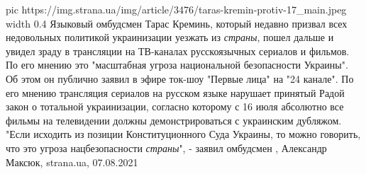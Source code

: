\ifcmt
  pic https://img.strana.ua/img/article/3476/taras-kremin-protiv-17_main.jpeg
  width 0.4
\fi
Языковый омбудсмен Тарас Креминь, который недавно призвал всех недовольных
политикой украинизации уезжать из \emph{страны}, пошел дальше и увидел зраду в
трансляции на ТВ-каналах русскоязычных сериалов и фильмов. По его мнению это
"масштабная угроза национальной безопасности Украины".  Об этом он публично
заявил в эфире ток-шоу "Первые лица" на "24 канале".  По его мнению трансляция
сериалов на русском языке нарушает принятый Радой закон о тотальной
украинизации, согласно которому с 16 июля абсолютно все фильмы на телевидении
должны демонстрироваться с украинским дубляжом.  "Если исходить из позиции
Конституционного Суда Украины, то можно говорить, что это угроза
нацбезопасности \emph{страны}", - заявил омбудсмен
, 
Александр Максюк, strana.ua, 07.08.2021
